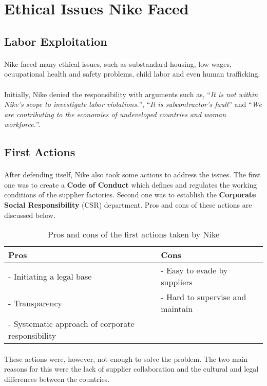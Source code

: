 \section{Ethical Issues Nike Faced}

\subsection{Labor Exploitation}

\paragraph{} Nike faced many ethical issues, such as substandard housing, low wages, ocuupational health and safety problems, child labor and even human trafficking.

\paragraph{} Initially, Nike denied the responsibility with arguments such as, \enquote{\textit{It is not within Nike’s scope to investigate labor violations.}}, \enquote{\textit{It is subcontractor's fault}} and \enquote{\textit{We are contributing to the economies of undeveloped countries and woman workforce.}}. 

\subsection{First Actions}

\paragraph{} After defending itself, Nike also took some actions to address the issues. The first one was to create a \textbf{Code of Conduct} which defines and regulates the working conditions of the supplier factories. Second one was to establish the \textbf{Corporate Social Responsibility} (CSR) department. Pros and cons of these actions are discussed below.

\begin{table}[H]
    \centering
    \begin{tabular}{|l|l|}
        \hline
        Pros & Cons \\
        \hline
        - Initiating a legal base & - Easy to evade by suppliers \\
        - Transparency & - Hard to supervise and maintain \\
        - Systematic approach of corporate responsibility & \\
        \hline
    \end{tabular}
    \caption{Pros and cons of the first actions taken by Nike}
    \label{tab:first-actions}
\end{table}

\paragraph{} These actions were, however, not enough to solve the problem. The two main reasons for this were the lack of supplier collaboration and the cultural and legal differences between the countries.
